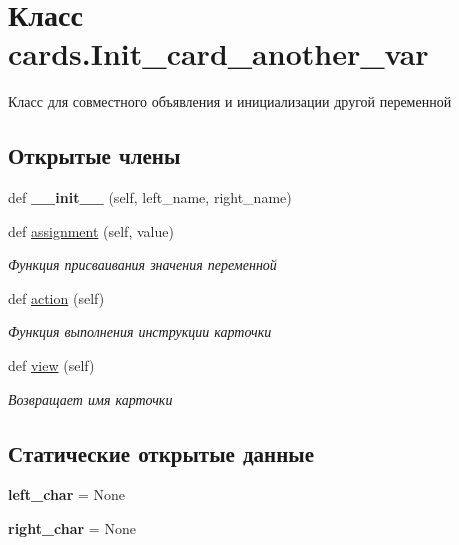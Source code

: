 \hypertarget{classcards_1_1_init__card__another__var}{}\section{Класс cards.\+Init\+\_\+card\+\_\+another\+\_\+var}
\label{classcards_1_1_init__card__another__var}


Класс для совместного объявления и инициализации другой переменной  


\subsection*{Открытые члены}
\begin{DoxyCompactItemize}
\item 
\mbox{\label{classcards_1_1_init__card__another__var_a26ab6d624027978f9d8c57e0ae9cf0a9}} 
def {\bfseries \+\_\+\+\_\+init\+\_\+\+\_\+} (self, left\+\_\+name, right\+\_\+name)
\item 
def \mbox{\hyperlink{classcards_1_1_init__card__another__var_ab1f64b363329c2bfdcdd26a92cda6971}{assignment}} (self, value)
\begin{DoxyCompactList}\small\item\em Функция присваивания значения переменной \end{DoxyCompactList}\item 
def \mbox{\hyperlink{classcards_1_1_init__card__another__var_a9afc4a0fc3e75aa914ac121fe626652e}{action}} (self)
\begin{DoxyCompactList}\small\item\em Функция выполнения инструкции карточки \end{DoxyCompactList}\item 
def \mbox{\hyperlink{classcards_1_1_init__card__another__var_a0481b3f8d1e7152c4a93279b6de5baf9}{view}} (self)
\begin{DoxyCompactList}\small\item\em Возвращает имя карточки \end{DoxyCompactList}\end{DoxyCompactItemize}
\subsection*{Статические открытые данные}
\begin{DoxyCompactItemize}
\item 
\mbox{\label{classcards_1_1_init__card__another__var_abf777a2fb9cad83c3557a291496cd808}} 
{\bfseries left\+\_\+char} = None
\item 
\mbox{\label{classcards_1_1_init__card__another__var_a0e3795c320fe1e1c84ae5aaff5eaf691}} 
{\bfseries right\+\_\+char} = None
\end{DoxyCompactItemize}


